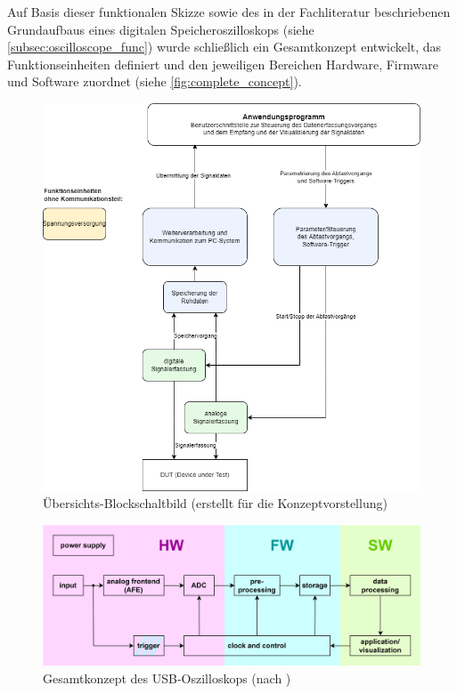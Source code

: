 \documentclass[a4paper, portrait, 12pt]{scrartcl} %
\begin{document}
Auf Basis dieser funktionalen Skizze sowie des in der Fachliteratur beschriebenen Grundaufbaus eines digitalen Speicheroszilloskops (siehe \autoref{subsec:oscilloscope_func}) wurde schließlich ein Gesamtkonzept entwickelt, das Funktionseinheiten definiert und den jeweiligen Bereichen Hardware, Firmware und Software zuordnet (siehe \autoref{fig:complete_concept}).

\begin{figure}[H]
	\centering
    \includegraphics[scale=0.4]{Projektarbeit_Architektur.png} 
	\caption{Übersichts-Blockschaltbild (erstellt für die Konzeptvorstellung)}
	\label{fig:block_concept}
\end{figure}

\begin{figure}[H]
	\centering
    \includegraphics[scale=0.14]{Projektstruktur.png} 
	\caption{Gesamtkonzept des USB-Oszilloskops (nach \cite[S. 216]{Muehl2020})}
	\label{fig:complete_concept}
\end{figure}
\end{document}
